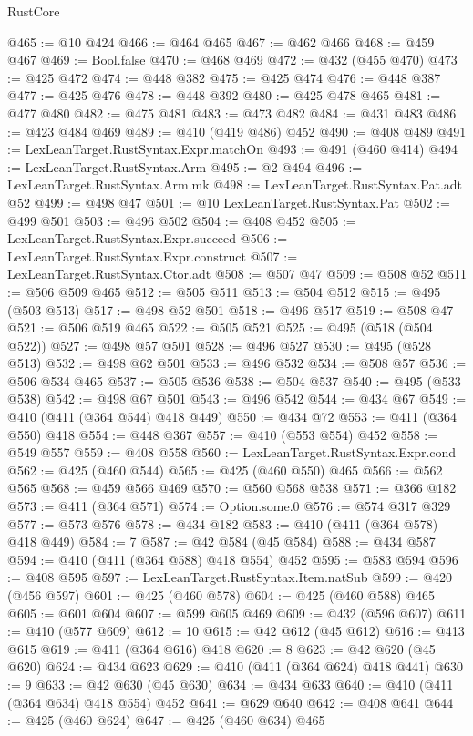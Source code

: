 \begin{lexlean}{RustCore}
\begin{coremodule}
@465 := @10 @424
@466 := @464 @465
@467 := @462 @466
@468 := @459 @467
@469 := Bool.false
@470 := @468 @469
@472 := @432 (@455 @470)
@473 := @425 @472
@474 := @448 @382
@475 := @425 @474
@476 := @448 @387
@477 := @425 @476
@478 := @448 @392
@480 := @425 @478 @465
@481 := @477 @480
@482 := @475 @481
@483 := @473 @482
@484 := @431 @483
@486 := @423 @484 @469
@489 := @410 (@419 @486) @452
@490 := @408 @489
@491 := LexLeanTarget.RustSyntax.Expr.matchOn
@493 := @491 (@460 @414)
@494 := LexLeanTarget.RustSyntax.Arm
@495 := @2 @494
@496 := LexLeanTarget.RustSyntax.Arm.mk
@498 := LexLeanTarget.RustSyntax.Pat.adt @52
@499 := @498 @47
@501 := @10 LexLeanTarget.RustSyntax.Pat
@502 := @499 @501
@503 := @496 @502
@504 := @408 @452
@505 := LexLeanTarget.RustSyntax.Expr.succeed
@506 := LexLeanTarget.RustSyntax.Expr.construct
@507 := LexLeanTarget.RustSyntax.Ctor.adt
@508 := @507 @47
@509 := @508 @52
@511 := @506 @509 @465
@512 := @505 @511
@513 := @504 @512
@515 := @495 (@503 @513)
@517 := @498 @52 @501
@518 := @496 @517
@519 := @508 @47
@521 := @506 @519 @465
@522 := @505 @521
@525 := @495 (@518 (@504 @522))
@527 := @498 @57 @501
@528 := @496 @527
@530 := @495 (@528 @513)
@532 := @498 @62 @501
@533 := @496 @532
@534 := @508 @57
@536 := @506 @534 @465
@537 := @505 @536
@538 := @504 @537
@540 := @495 (@533 @538)
@542 := @498 @67 @501
@543 := @496 @542
@544 := @434 @67
@549 := @410 (@411 (@364 @544) @418 @449)
@550 := @434 @72
@553 := @411 (@364 @550) @418
@554 := @448 @367
@557 := @410 (@553 @554) @452
@558 := @549 @557
@559 := @408 @558
@560 := LexLeanTarget.RustSyntax.Expr.cond
@562 := @425 (@460 @544)
@565 := @425 (@460 @550) @465
@566 := @562 @565
@568 := @459 @566 @469
@570 := @560 @568 @538
@571 := @366 @182
@573 := @411 (@364 @571)
@574 := Option.some.{0}
@576 := @574 @317 @329
@577 := @573 @576
@578 := @434 @182
@583 := @410 (@411 (@364 @578) @418 @449)
@584 := 7
@587 := @42 @584 (@45 @584)
@588 := @434 @587
@594 := @410 (@411 (@364 @588) @418 @554) @452
@595 := @583 @594
@596 := @408 @595
@597 := LexLeanTarget.RustSyntax.Item.natSub
@599 := @420 (@456 @597)
@601 := @425 (@460 @578)
@604 := @425 (@460 @588) @465
@605 := @601 @604
@607 := @599 @605 @469
@609 := @432 (@596 @607)
@611 := @410 (@577 @609)
@612 := 10
@615 := @42 @612 (@45 @612)
@616 := @413 @615
@619 := @411 (@364 @616) @418
@620 := 8
@623 := @42 @620 (@45 @620)
@624 := @434 @623
@629 := @410 (@411 (@364 @624) @418 @441)
@630 := 9
@633 := @42 @630 (@45 @630)
@634 := @434 @633
@640 := @410 (@411 (@364 @634) @418 @554) @452
@641 := @629 @640
@642 := @408 @641
@644 := @425 (@460 @624)
@647 := @425 (@460 @634) @465

\end{coremodule}
\end{lexlean}
